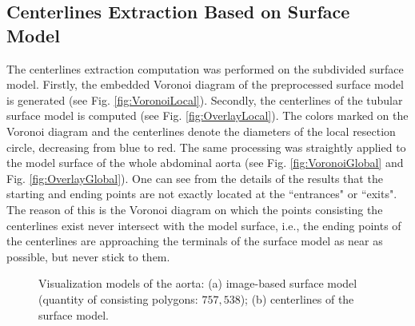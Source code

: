\subsection{Centerlines Extraction Based on Surface Model}

The centerlines extraction computation was performed on the subdivided surface model.
Firstly, the embedded Voronoi diagram of the preprocessed surface model is generated (see Fig. \ref{fig:VoronoiLocal}).
Secondly, the centerlines of the tubular surface model is computed (see Fig. \ref{fig:OverlayLocal}).
The colors marked on the Voronoi diagram and the centerlines denote the diameters of the local resection circle, decreasing from blue to red.
The same processing was straightly applied to the model surface of the whole abdominal aorta (see Fig. \ref{fig:VoronoiGlobal} and Fig. \ref{fig:OverlayGlobal}).
One can see from the details of the results that the starting and ending points are not exactly located at the ``entrances" or ``exits".
The reason of this is the Voronoi diagram on which the points consisting the centerlines exist never intersect with the model surface, i.e., the ending points of the centerlines are approaching the terminals of the surface model as near as possible, but never stick to them.
\begin{figure}[t]
\centering
{}
\hfil
{}
\caption{Visualization models of the aorta: (a) image-based surface model (quantity of consisting polygons: $757,538$); (b) centerlines of the surface model.}%
\label{fig:VisualizationModel}
\end{figure}

